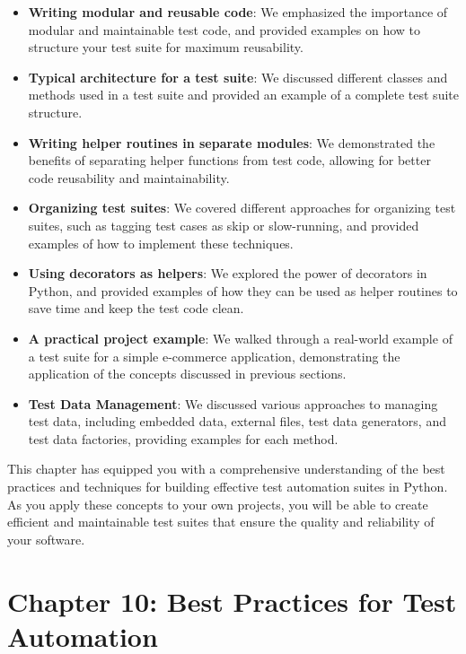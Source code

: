 \documentclass[
  paper=a4,
  ,captions=tableheading
]{scrartcl}
\begin{document}
\begin{itemize}
\item
  \textbf{Writing modular and reusable code}: We emphasized the
  importance of modular and maintainable test code, and provided
  examples on how to structure your test suite for maximum reusability.
\item
  \textbf{Typical architecture for a test suite}: We discussed different
  classes and methods used in a test suite and provided an example of a
  complete test suite structure.
\item
  \textbf{Writing helper routines in separate modules}: We demonstrated
  the benefits of separating helper functions from test code, allowing
  for better code reusability and maintainability.
\item
  \textbf{Organizing test suites}: We covered different approaches for
  organizing test suites, such as tagging test cases as skip or
  slow-running, and provided examples of how to implement these
  techniques.
\item
  \textbf{Using decorators as helpers}: We explored the power of
  decorators in Python, and provided examples of how they can be used as
  helper routines to save time and keep the test code clean.
\item
  \textbf{A practical project example}: We walked through a real-world
  example of a test suite for a simple e-commerce application,
  demonstrating the application of the concepts discussed in previous
  sections.
\item
  \textbf{Test Data Management}: We discussed various approaches to
  managing test data, including embedded data, external files, test data
  generators, and test data factories, providing examples for each
  method.
\end{itemize}

This chapter has equipped you with a comprehensive understanding of the
best practices and techniques for building effective test automation
suites in Python. As you apply these concepts to your own projects, you
will be able to create efficient and maintainable test suites that
ensure the quality and reliability of your software.

\hypertarget{chapter-10-best-practices-for-test-automation}{%
\chapter{Chapter 10: Best Practices for Test
Automation}\label{chapter-10-best-practices-for-test-automation}}
\end{document}
